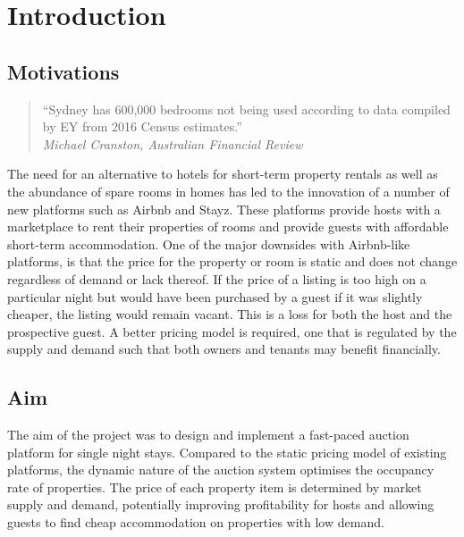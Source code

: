 \section{Introduction}

\subsection{Motivations}

\smallskip
\begin{quote}
  ``Sydney has 600,000 bedrooms not being used according to data
  compiled by EY from 2016 Census estimates.'' \\
  \hspace*{\fill}\emph{Michael Cranston, Australian Financial Review}
\end{quote}

The need for an alternative to hotels for short-term property rentals as well
as the abundance of spare rooms in homes has led to the innovation of
a number of new platforms such as Airbnb and Stayz.
These platforms provide hosts with a marketplace to rent their properties of rooms and
provide guests with affordable short-term accommodation. One of the major downsides
with Airbnb-like platforms, is that
the price for the property or room is static and does not change regardless
of demand or lack thereof. If the price of a listing is too high on a particular night
but would have been purchased by a guest if it was slightly cheaper, the listing would
remain vacant. This is a loss for both the host and the prospective guest. A better
pricing model is required, one that is regulated by the supply and demand such that
both owners and tenants may benefit financially.

\subsection{Aim}

The aim of the project was to design and implement a fast-paced auction
platform for single night stays. Compared to the static pricing
model of existing platforms, the dynamic nature of the auction system
optimises the occupancy rate of properties. The price of each property item is
determined by market supply and demand, potentially improving profitability for
hosts and allowing guests to find cheap accommodation on properties with low demand.

